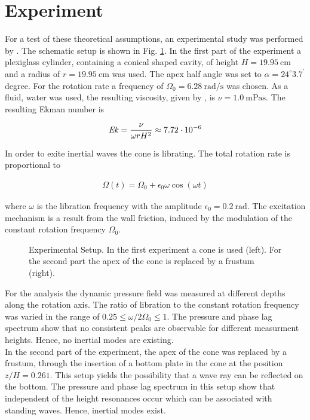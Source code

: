 \section{Experiment}
\label{cone:theorie_exp}

For a test of these theoretical assumptions, an experimental study was performed by \citep{Beardsley1970}.
The schematic setup is shown in Fig. \ref{cone:setup_experiment}.
In the first part of the experiment a plexiglass cylinder, containing a conical shaped cavity,
of height $H=\SI{19.95}{\centi\meter}$ and a radius of $r=\SI{19.95}{\centi\meter}$ was used.
The apex half angle was set to $\alpha=24^{\circ}3.7^{\prime}$ degree.
For the rotation rate a frequency of $\Omega_0 =\SI{6.28}{\radian\per\second}$ was chosen.
As a fluid, water was used, the resulting viscosity, given by \citep{tipler2003}, is $\nu = \SI{1.0}{\milli\pascal\second}$.
The resulting Ekman number is

\begin{align}
    \mbox{\textit{Ek}} = \frac{\nu}{\omega r H^2} \approx 7.72\cdot 10^{-6}
\end{align}

In order to exite inertial waves the cone is librating.
The total rotation rate is proportional to

\begin{align}
\Omega(t) = \Omega_0 + \epsilon_0 \omega \cos(\omega t)
\end{align}

where $\omega$ is the libration frequency with the amplitude $\epsilon_0=\SI{0.2}{\radian}$.
The excitation mechanism is a result from the wall friction, induced
by the modulation of the constant rotation frequency $\Omega_0$.

\begin{figure}[!b]
      \centering
      \caption{
          Experimental Setup. In the first experiment a cone is used (left). For the second part the apex of the cone
          is replaced by a frustum (right).
      \label{cone:setup_experiment}
      }
\end{figure}

For the analysis the dynamic pressure field was measured at different depths along the rotation axis.
The ratio of libration to the constant rotation frequency was varied in the range of ${0.25\leq\omega/2\Omega_0\leq1}$.
The pressure and phase lag spectrum  show that no consistent peaks are observable for different measurment heights.
Hence, no inertial modes are existing.
\\
In the second part of the experiment, the apex of the cone was replaced by a frustum, through the
insertion of a bottom plate in the cone at the position $z/H = 0.261$.
This setup yields the possibility that a wave ray can be reflected on the bottom.
The pressure and phase lag spectrum in this setup show that
independent of the height resonances occur which can be associated with standing waves.
Hence, inertial modes exist.

